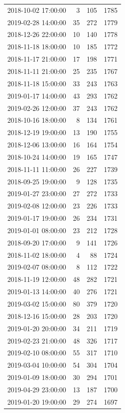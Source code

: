 \begin{tabular}{lrrr}
2018-10-02 17:00:00 & 3 & 105 & 1785 \\
2019-02-28 14:00:00 & 35 & 272 & 1779 \\
2018-12-26 22:00:00 & 10 & 140 & 1778 \\
2018-11-18 18:00:00 & 10 & 185 & 1772 \\
2018-11-17 21:00:00 & 17 & 198 & 1771 \\
2018-11-11 21:00:00 & 25 & 235 & 1767 \\
2018-11-18 15:00:00 & 33 & 243 & 1763 \\
2019-01-17 14:00:00 & 43 & 293 & 1762 \\
2019-02-26 12:00:00 & 37 & 243 & 1762 \\
2018-10-16 18:00:00 & 8 & 134 & 1761 \\
2018-12-19 19:00:00 & 13 & 190 & 1755 \\
2018-12-06 13:00:00 & 16 & 164 & 1754 \\
2018-10-24 14:00:00 & 19 & 165 & 1747 \\
2018-11-11 11:00:00 & 26 & 227 & 1739 \\
2018-09-25 19:00:00 & 9 & 128 & 1735 \\
2019-01-27 23:00:00 & 27 & 272 & 1733 \\
2019-02-08 12:00:00 & 23 & 226 & 1733 \\
2019-01-17 19:00:00 & 26 & 234 & 1731 \\
2019-01-01 08:00:00 & 23 & 212 & 1728 \\
2018-09-20 17:00:00 & 9 & 141 & 1726 \\
2018-11-02 18:00:00 & 4 & 88 & 1724 \\
2019-02-07 08:00:00 & 8 & 112 & 1722 \\
2018-11-19 12:00:00 & 48 & 282 & 1721 \\
2019-01-13 14:00:00 & 40 & 276 & 1721 \\
2019-03-02 15:00:00 & 80 & 379 & 1720 \\
2018-12-16 15:00:00 & 28 & 203 & 1720 \\
2019-01-20 20:00:00 & 34 & 211 & 1719 \\
2019-02-23 21:00:00 & 48 & 326 & 1717 \\
2019-02-10 08:00:00 & 55 & 317 & 1710 \\
2019-03-04 10:00:00 & 54 & 304 & 1704 \\
2019-01-09 18:00:00 & 30 & 294 & 1701 \\
2019-04-29 23:00:00 & 13 & 187 & 1700 \\
2019-01-20 19:00:00 & 29 & 274 & 1697 \\

\end{tabular}
